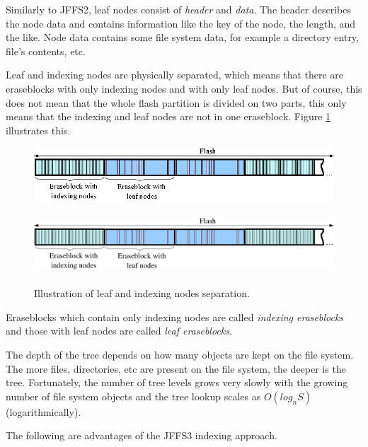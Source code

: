 \documentclass[12pt,a4paper,oneside,titlepage]{article}
\begin{document}
Similarly to JFFS2, leaf nodes consist of \emph{header} and \emph{data}. The
header describes the node data and contains information like the key of the
node, the length, and the like. Node data contains some file system data, for
example a directory entry, file's contents, etc. 

Leaf and indexing nodes are physically separated, which means that there are
eraseblocks with only indexing nodes and with only leaf nodes. But of course,
this does not mean that the whole flash partition is divided on two parts, this
only means that the indexing and leaf nodes are not in one eraseblock. Figure
\ref{ref_FigureFlash_01} illustrates this.

%
%
\begin{figure}[h]
\begin{center}
\begin{htmlonly}
\includegraphics{pics/flash-01.png}
\end{htmlonly}
\includegraphics[width=159mm,height=30mm]{pics/flash-01.pdf}
\end{center}
\caption{Illustration of leaf and indexing nodes separation.}
\label{ref_FigureFlash_01}
\end{figure}

Eraseblocks which contain only indexing nodes are called \emph{indexing
eraseblocks} and those with leaf nodes are called \emph{leaf eraseblocks}.

The depth of the tree depends on how many objects are kept on the file system.
The more files, directories, etc are present on the file system, the deeper is
the tree. Fortunately, the number of tree levels grows very slowly with the
growing number of file system objects and the tree lookup scales as
$O(log_n{S})$ (logarithmically).

The following are advantages of the JFFS3 indexing approach.
\end{document}
